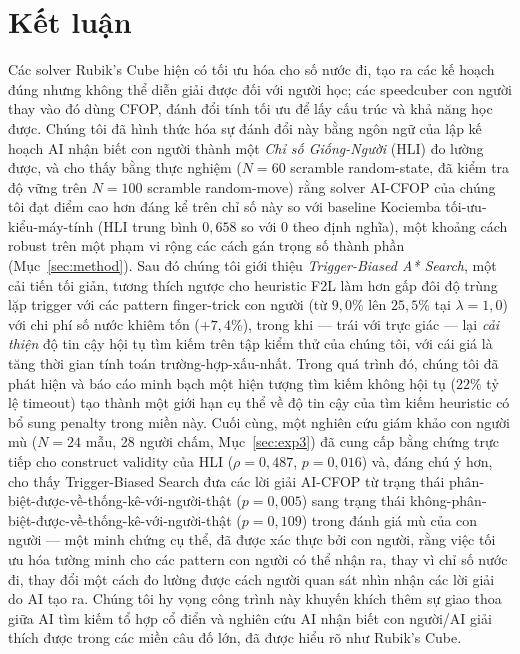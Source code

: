 \documentclass[10pt,conference]{article}
\begin{document}
\section{Kết luận}
Các solver Rubik's Cube hiện có tối ưu hóa cho số nước đi, tạo ra các
kế hoạch đúng nhưng không thể diễn giải được đối với người học; các
speedcuber con người thay vào đó dùng CFOP, đánh đổi tính tối ưu để lấy
cấu trúc và khả năng học được. Chúng tôi đã hình thức hóa sự đánh đổi
này bằng ngôn ngữ của lập kế hoạch AI nhận biết con người thành một
\emph{Chỉ số Giống-Người} (HLI) đo lường được, và cho thấy bằng thực
nghiệm ($N=60$ scramble random-state, đã kiểm tra độ vững trên $N=100$
scramble random-move) rằng solver AI-CFOP của chúng tôi đạt điểm
cao hơn đáng kể trên chỉ số này so với baseline Kociemba tối-ưu-kiểu-máy-tính
(HLI trung bình $0,658$ so với $0$ theo định nghĩa), một khoảng cách
robust trên một phạm vi rộng các cách gán trọng số thành phần
(Mục~\ref{sec:method}). Sau đó chúng tôi giới thiệu \emph{Trigger-Biased
A* Search}, một cải tiến tối giản, tương thích ngược cho heuristic F2L
làm hơn gấp đôi độ trùng lặp trigger với các pattern finger-trick con
người (từ $9,0\%$ lên $25,5\%$ tại $\lambda=1,0$) với chi phí số nước
khiêm tốn ($+7,4\%$), trong khi — trái với trực giác — lại \emph{cải
thiện} độ tin cậy hội tụ tìm kiếm trên tập kiểm thử của chúng tôi, với
cái giá là tăng thời gian tính toán trường-hợp-xấu-nhất. Trong quá trình
đó, chúng tôi đã phát hiện và báo cáo minh bạch một hiện tượng tìm kiếm
không hội tụ ($22\%$ tỷ lệ timeout) tạo thành một giới hạn cụ thể về độ
tin cậy của tìm kiếm heuristic có bổ sung penalty trong miền này. Cuối
cùng, một nghiên cứu giám khảo con người mù ($N=24$ mẫu, 28 người chấm,
Mục~\ref{sec:exp3}) đã cung cấp bằng chứng trực tiếp cho construct
validity của HLI ($\rho=0,487$, $p=0,016$) và, đáng chú ý hơn, cho thấy
Trigger-Biased Search đưa các lời giải AI-CFOP từ trạng thái
phân-biệt-được-về-thống-kê-với-người-thật ($p=0,005$) sang trạng thái
không-phân-biệt-được-về-thống-kê-với-người-thật ($p=0,109$) trong đánh
giá mù của con người — một minh chứng cụ thể, đã được xác thực bởi con
người, rằng việc tối ưu hóa tường minh cho các pattern con người có thể
nhận ra, thay vì chỉ số nước đi, thay đổi một cách đo lường được cách
người quan sát nhìn nhận các lời giải do AI tạo ra. Chúng tôi hy vọng
công trình này khuyến khích thêm sự giao thoa giữa AI tìm kiếm tổ hợp
cổ điển và nghiên cứu AI nhận biết con người/AI giải thích được trong
các miền câu đố lớn, đã được hiểu rõ như Rubik's Cube.
\end{document}
